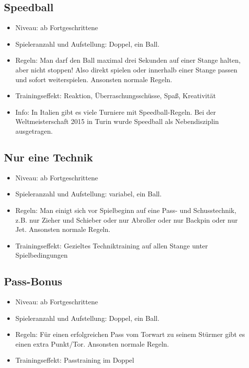 \subsection{Speedball}
\label{spielformen:sonderregeln:speedball}

\begin{itemize}
\item Niveau: ab Fortgeschrittene
\item Spieleranzahl und Aufstellung: Doppel, ein Ball.
\item Regeln: Man darf den Ball maximal drei Sekunden auf einer Stange halten, aber
nicht stoppen! Also direkt spielen oder innerhalb einer Stange passen und sofort
weiterspielen. Ansonsten normale Regeln.
\item Trainingseffekt: Reaktion, Überraschungsschüsse, Spaß, Kreativität
\item Info: In Italien gibt es viele Turniere mit Speedball-Regeln. Bei der Weltmeisterschaft 2015 in Turin wurde Speedball als Nebendisziplin ausgetragen. 
\end{itemize}


\subsection{Nur eine Technik}
\label{spielformen:sonderregeln:nureinetechnik}

\begin{itemize}
\item Niveau: ab Fortgeschrittene
\item Spieleranzahl und Aufstellung: variabel, ein Ball.
\item Regeln: Man einigt sich vor Spielbeginn auf eine Pass- und Schusstechnik, z.B. nur Zieher und Schieber oder nur Abroller oder nur Backpin oder nur Jet.
Ansonsten normale Regeln.
\item Trainingseffekt: Gezieltes Techniktraining auf allen Stange unter Spielbedingungen
\end{itemize}


\subsection{Pass-Bonus}
\label{spielformen:sonderregeln:passbonus}

\begin{itemize}
\item Niveau: ab Fortgeschrittene
\item Spieleranzahl und Aufstellung: Doppel, ein Ball.
\item Regeln: Für einen erfolgreichen Pass vom Torwart zu seinem Stürmer gibt es einen extra Punkt/Tor. 
Ansonsten normale Regeln.
\item Trainingseffekt: Passtraining im Doppel
\end{itemize}


